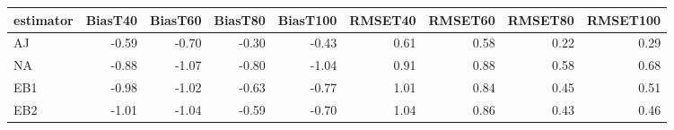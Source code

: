 \begin{table}[ht]
\centering
\begin{tabular}{lrrrrrrrr}
  \toprule
estimator & BiasT40 & BiasT60 & BiasT80 & BiasT100 & RMSET40 & RMSET60 & RMSET80 & RMSET100 \\ 
  \midrule
AJ & -0.59 & -0.70 & -0.30 & -0.43 & 0.61 & 0.58 & 0.22 & 0.29 \\ 
  NA & -0.88 & -1.07 & -0.80 & -1.04 & 0.91 & 0.88 & 0.58 & 0.68 \\ 
  EB1 & -0.98 & -1.02 & -0.63 & -0.77 & 1.01 & 0.84 & 0.45 & 0.51 \\ 
  EB2 & -1.01 & -1.04 & -0.59 & -0.70 & 1.04 & 0.86 & 0.43 & 0.46 \\ 
   \bottomrule
\end{tabular}
\end{table}
